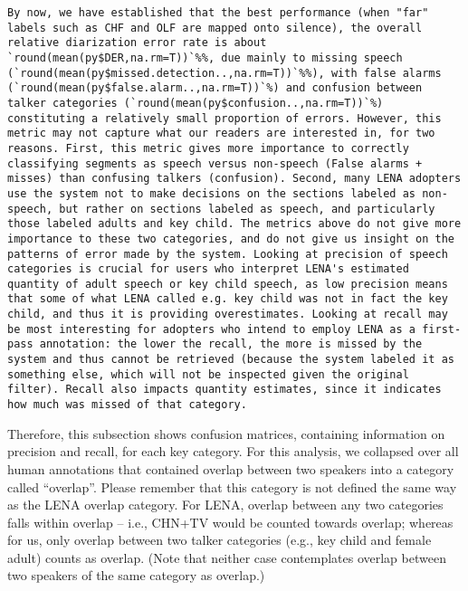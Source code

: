 \documentclass[english,floatsintext,man]{apa6}
\begin{document}
\begin{verbatim}
By now, we have established that the best performance (when "far" labels such as CHF and OLF are mapped onto silence), the overall relative diarization error rate is about `round(mean(py$DER,na.rm=T))`%%, due mainly to missing speech (`round(mean(py$missed.detection..,na.rm=T))`%%), with false alarms (`round(mean(py$false.alarm..,na.rm=T))`%) and confusion between talker categories (`round(mean(py$confusion..,na.rm=T))`%) constituting a relatively small proportion of errors. However, this metric may not capture what our readers are interested in, for two reasons. First, this metric gives more importance to correctly classifying segments as speech versus non-speech (False alarms + misses) than confusing talkers (confusion). Second, many LENA adopters use the system not to make decisions on the sections labeled as non-speech, but rather on sections labeled as speech, and particularly those labeled adults and key child. The metrics above do not give more importance to these two categories, and do not give us insight on the patterns of error made by the system. Looking at precision of speech categories is crucial for users who interpret LENA's estimated quantity of adult speech or key child speech, as low precision means that some of what LENA called e.g. key child was not in fact the key child, and thus it is providing overestimates. Looking at recall may be most interesting for adopters who intend to employ LENA as a first-pass annotation: the lower the recall, the more is missed by the system and thus cannot be retrieved (because the system labeled it as something else, which will not be inspected given the original filter). Recall also impacts quantity estimates, since it indicates how much was missed of that category.
\end{verbatim}

Therefore, this subsection shows confusion matrices, containing
information on precision and recall, for each key category. For this
analysis, we collapsed over all human annotations that contained overlap
between two speakers into a category called \enquote{overlap}. Please
remember that this category is not defined the same way as the LENA
overlap category. For LENA, overlap between any two categories falls
within overlap -- i.e., CHN+TV would be counted towards overlap; whereas
for us, only overlap between two talker categories (e.g., key child and
female adult) counts as overlap. (Note that neither case contemplates
overlap between two speakers of the same category as overlap.)
\end{document}
